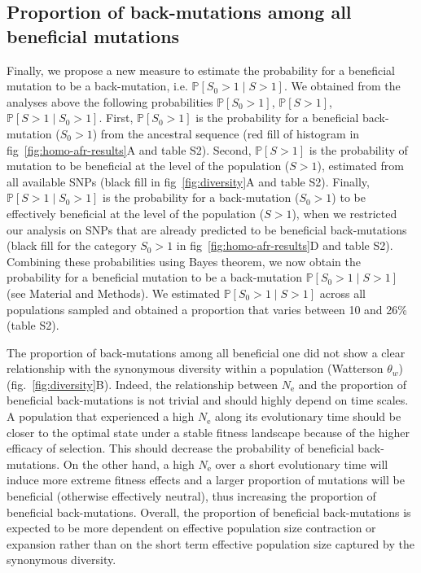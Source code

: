 \documentclass{article}
\newcommand{\Ne}{N_{\textrm{e}}}
\newcommand{\Sphy}{S_{0}}
\newcommand{\given}{\mid}
\newcommand{\Spop}{S}
\begin{document}
    \subsection*{Proportion of back-mutations among all beneficial mutations}

    Finally, we propose a new measure to estimate the probability for a beneficial mutation to be a back-mutation, i.e. $\mathbb{P} [ \Sphy > 1  \given  \Spop > 1]$.
    We obtained from the analyses above the following probabilities $\mathbb{P} [ \Sphy > 1 ]$, $\mathbb{P} [ \Spop > 1 ]$, $\mathbb{P} [ \Spop > 1  \given  \Sphy > 1]$.
    First, $\mathbb{P} [ \Sphy > 1 ]$ is the probability for a beneficial back-mutation ($\Sphy > 1$) from the ancestral sequence (red fill of histogram in fig~\ref{fig:homo-afr-results}A and table S2).
    Second, $\mathbb{P} [ \Spop > 1 ]$ is the probability of mutation to be beneficial at the level of the population ($\Spop > 1$), estimated from all available SNPs (black fill in fig~\ref{fig:diversity}A and table S2).
    Finally, $\mathbb{P} [ \Spop > 1  \given  \Sphy > 1]$ is the probability for a back-mutation ($\Sphy > 1$) to be effectively beneficial at the level of the population ($\Spop > 1$), when we restricted our analysis on SNPs that are already predicted to be beneficial back-mutations (black fill for the category $\Sphy > 1$ in fig~\ref{fig:homo-afr-results}D and table S2).
    Combining these probabilities using Bayes theorem, we now obtain the probability for a beneficial mutation to be a back-mutation $\mathbb{P} [ \Sphy > 1  \given  \Spop > 1]$ (see Material and Methods).
    We estimated $\mathbb{P} [ \Sphy > 1  \given  \Spop > 1]$ across all populations sampled and obtained a proportion that varies between 10 and 26\% (table S2).

    The proportion of back-mutations among all beneficial one did not show a clear relationship with the synonymous diversity within a population (Watterson $\theta_w$) (fig.~\ref{fig:diversity}B).
    Indeed, the relationship between $\Ne$ and the proportion of beneficial back-mutations is not trivial and should highly depend on time scales\cite{charlesworth_other_2007}.
    A population that experienced a high $\Ne$ along its evolutionary time should be closer to the optimal state under a stable fitness landscape because of the higher efficacy of selection.
    This should decrease the probability of beneficial back-mutations.
    On the other hand, a high $\Ne$ over a short evolutionary time will induce more extreme fitness effects and a larger proportion of mutations will be beneficial (otherwise effectively neutral), thus increasing the proportion of beneficial back-mutations.
    Overall, the proportion of beneficial back-mutations is expected to be more dependent on effective population size contraction or expansion rather than on the short term effective population size captured by the synonymous diversity\cite{charlesworth_other_2007}.
\end{document}
